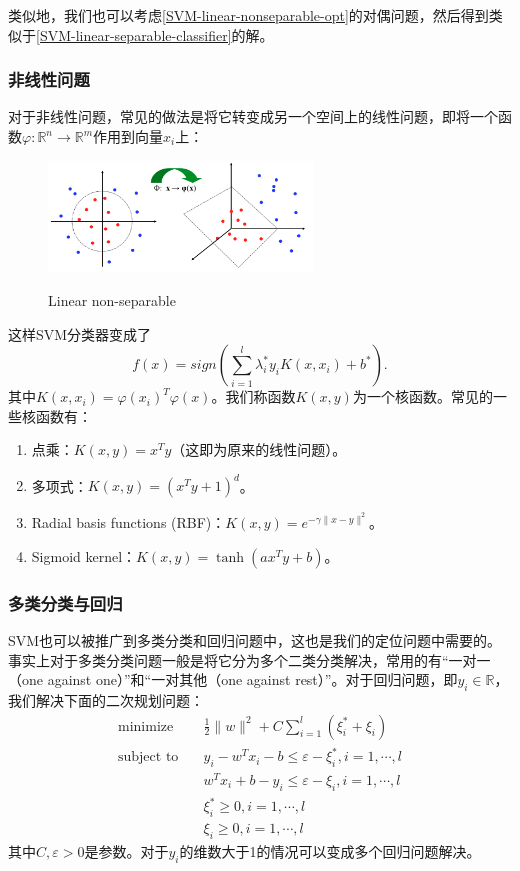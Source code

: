 \documentclass[a4paper,10pt]{article}
\begin{document}
\begin{CJK*}{UTF8}{gbsn}
类似地，我们也可以考虑\eqref{SVM-linear-nonseparable-opt}的对偶问题，然后得到类似于\eqref{SVM-linear-separable-classifier}的解。

\subsubsection{非线性问题}

对于非线性问题，常见的做法是将它转变成另一个空间上的线性问题，即将一个函数$\varphi: \mathbb R^n \to \mathbb R^m$作用到向量$x_i$上：
\begin{figure}[htbp]
\centering
\includegraphics[width=7cm]{SVM2.png}
   　　\caption{Linear non-separable}
   \label{SVM-feature-space-fig}
\end{figure}

这样SVM分类器变成了
\begin{equation}\label{SVM-feature-classifier}
f(x) = sign(\sum_{i=1}^l \lambda_i^* y_i K(x, x_i) + b^*).
\end{equation}
其中$K(x, x_i) = \varphi(x_i)^T \varphi(x)$。我们称函数$K(x, y)$为一个核函数。常见的一些核函数有：
\begin{enumerate}[(1)]
\item 点乘：$K(x, y) = x^T y$（这即为原来的线性问题）。
\item 多项式：$K(x, y) = (x^T y + 1)^d$。
\item Radial basis functions (RBF)：$K(x, y) = e^{-\gamma\|x-y\|^2}$。
\item Sigmoid kernel：$K(x, y) = \tanh (ax^Ty + b)$。
\end{enumerate}

\subsubsection{多类分类与回归}

SVM也可以被推广到多类分类和回归问题中，这也是我们的定位问题中需要的。事实上对于多类分类问题一般是将它分为多个二类分类解决，常用的有“一对一（one against one）”和“一对其他（one against rest）”。对于回归问题，即$y_i \in \mathbb R$，我们解决下面的二次规划问题：
\begin{equation}\label{SVM-regression-opt}
\begin{aligned}
\text{minimize} \quad & \frac{1}{2}\| w\|^2 + C\sum_{i=1}^l (\xi_i^* + \xi_i) \\
\text{subject to} \quad & y_i - w^T x_i - b \le \varepsilon - \xi_i^*, i = 1, \cdots, l\\
& w^T x_i + b - y_i \le \varepsilon - \xi_i, i = 1, \cdots, l\\
& \xi_i^* \ge 0, i = 1, \cdots, l\\
& \xi_i \ge 0, i = 1, \cdots, l
\end{aligned}
\end{equation}
其中$C, \varepsilon>0$是参数。对于$y_i$的维数大于1的情况可以变成多个回归问题解决。


\end{CJK*}
\end{document}
